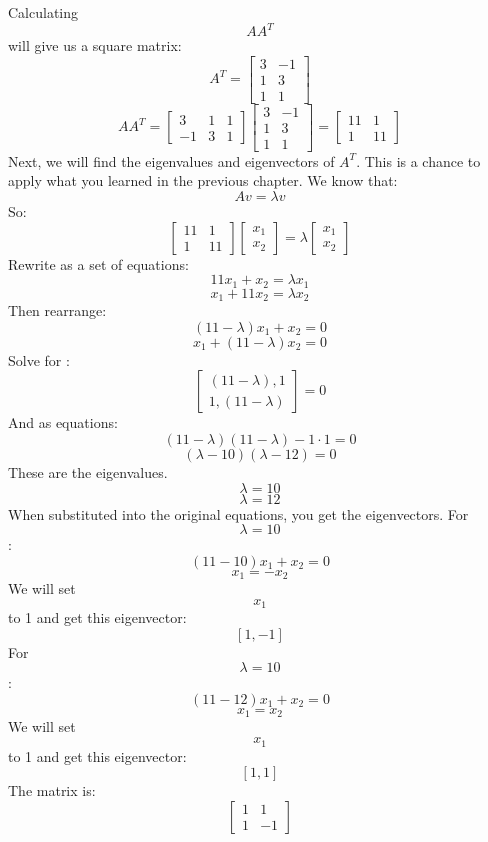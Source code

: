 Calculating $$AA^T$$ will give us a square matrix:
$$ A^T = \begin{bmatrix}
3 & -1\\
1 & 3 \\
1 & 1 
\end{bmatrix}$$
$$AA^T = \begin{bmatrix}
3 & 1 & 1\\
 -1 & 3 & 1
\end{bmatrix}
\begin{bmatrix}
3 & -1\\
1 & 3\\
1 & 1
\end{bmatrix}
= \begin{bmatrix}
11 & 1\\
 1 & 11 
\end{bmatrix}
$$
Next, we will find the eigenvalues and eigenvectors of $A^T$. This is a chance to apply what you learned in the previous chapter. We know that:
\begin{equation}
Av = \lambda v
\end{equation}
So:
$$
\begin{bmatrix}
11 & 1 \\
 1 & 11  
\end{bmatrix}
\begin{bmatrix}
x_1  \\
x_2 
\end{bmatrix}
=
\lambda 
\begin{bmatrix}
x_1   \\
x_2 
\end{bmatrix}
$$
Rewrite as a set of equations:
$$11x_1 + x_2 = \lambda x_1$$
$$x_1 + 11x_2 = \lambda x_2$$
Then rearrange:
$$(11−\lambda )x_1 +x_2 =0$$
$$x_1 +(11−\lambda )x_2 =0 $$
Solve for \lambda :
$$\begin{bmatrix}
(11 -\lambda), 1 \\
 1, (11 -\lambda) 
\end{bmatrix} = 0$$
And as equations:
$$(11 − \lambda)(11 − \lambda) − 1 · 1 = 0$$
$$(\lambda − 10)(\lambda − 12) = 0$$
These are the eigenvalues.
$$\lambda = 10$$
$$\lambda = 12$$
When substituted into the original equations, you get the eigenvectors. For $$ \lambda = 10$$:
$$(11−10)x_1 +x_2 =0 $$
$$x_1 = -x_2$$
We will set $$x_1$$ to 1 and get this eigenvector:
$$\left[ 1,-1 \right]$$
For $$ \lambda = 10$$:
$$(11−12)x_1 +x_2 =0  $$
$$x_1 = x_2 $$
We will set $$x_1$$ to 1 and get this eigenvector:
$$\left[ 1,1 \right]$$
The matrix is:
$$
\begin{bmatrix}
1 & 1 \\
1 & -1 
\end{bmatrix}
$$
